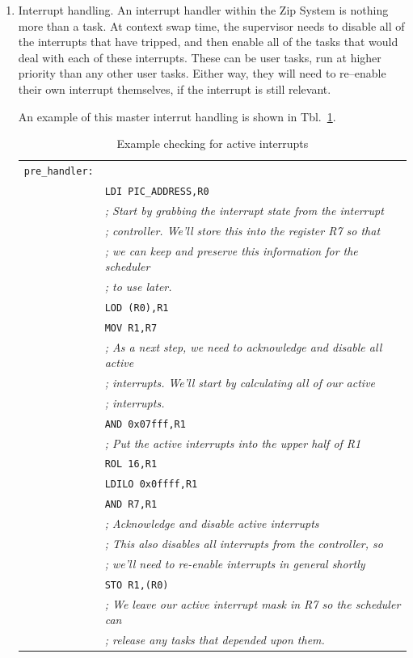 \documentclass{gqtekspec}
\begin{document}
\begin{enumerate}
\item Interrupt handling.  An interrupt handler within the Zip System is nothing
	more than a task.  At context swap time, the supervisor needs to
	disable all of the interrupts that have tripped, and then enable
	all of the tasks that would deal with each of these interrupts.
	These can be user tasks, run at higher priority than any other user
	tasks.  Either way, they will need to re--enable their own interrupt
	themselves, if the interrupt is still relevant.

	An example of this master interrut handling is shown in 
	Tbl.~\ref{tbl:pre-handler}.
\begin{table}\begin{center}
\begin{tabular}{ll}
{\tt pre\_handler:} \\
&	{\tt LDI PIC\_ADDRESS,R0 } \\
&	{\em ; Start by grabbing the interrupt state from the interrupt}\\
&	{\em ; controller.  We'll store this into the register R7 so that }\\
&	{\em ; we can keep and preserve this information for the scheduler}\\
&	{\em ; to use later. }\\
&	{\tt LOD (R0),R1} \\
&	{\tt MOV R1,R7 } \\
&	{\em ; As a next step, we need to acknowledge and disable all active}\\
&	{\em ; interrupts. We'll start by calculating all of our active}\\
&	{\em ; interrupts.}\\
&	{\tt AND 0x07fff,R1 } \\
&	{\em ; Put the active interrupts into the upper half of R1} \\
&	{\tt ROL 16,R1 } \\
&	{\tt LDILO 0x0ffff,R1	} \\
&	{\tt AND R7,R1}\\
&	{\em ; Acknowledge and disable active interrupts}\\
&	{\em ; This also disables all interrupts from the controller, so}\\
&	{\em ; we'll need to re-enable interrupts in general shortly } \\
&	{\tt STO R1,(R0) } \\
&	{\em ; We leave our active interrupt mask in R7 so the scheduler can}\\
&	{\em ; release any tasks that depended upon them. } \\
\end{tabular}
\caption{Example checking for active interrupts}\label{tbl:pre-handler}
\end{center}\end{table}


\end{enumerate}
\end{document}
